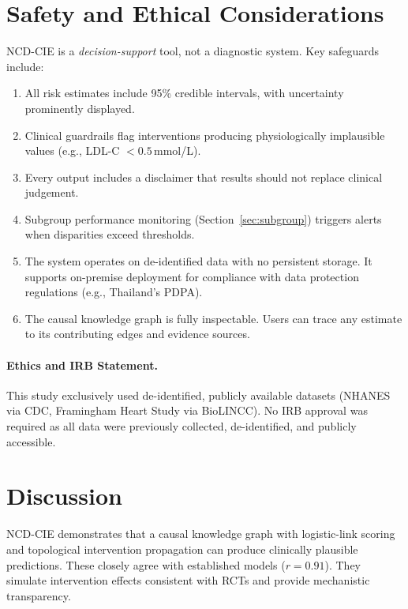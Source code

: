 \documentclass[runningheads]{llncs}
\begin{document}
\section{Safety and Ethical Considerations}\label{sec:ethics}

NCD-CIE is a \emph{decision-support} tool, not a diagnostic system.
Key safeguards include:
\begin{enumerate}
\item All risk estimates include 95\% credible intervals, with
  uncertainty prominently displayed.
\item Clinical guardrails flag interventions producing physiologically
  implausible values (e.g., LDL-C $< 0.5$\,mmol/L).
\item Every output includes a disclaimer that results should not
  replace clinical judgement.
\item Subgroup performance monitoring (Section~\ref{sec:subgroup})
  triggers alerts when disparities exceed thresholds.
\item The system operates on de-identified data with no persistent
  storage.
  It supports on-premise deployment for compliance with data
  protection regulations (e.g., Thailand's PDPA).
\item The causal knowledge graph is fully inspectable.
  Users can trace any estimate to its contributing edges and evidence
  sources.
\end{enumerate}

\paragraph{Ethics and IRB Statement.}
This study exclusively used de-identified, publicly available
datasets (NHANES via CDC, Framingham Heart Study via BioLINCC).
No IRB approval was required as all data were previously collected,
de-identified, and publicly accessible.

\section{Discussion}\label{sec:discussion}

NCD-CIE demonstrates that a causal knowledge graph with logistic-link
scoring and topological intervention propagation can produce
clinically plausible predictions.
These closely agree with established models ($r = 0.91$).
They simulate intervention effects consistent with RCTs and provide
mechanistic transparency.
\end{document}
